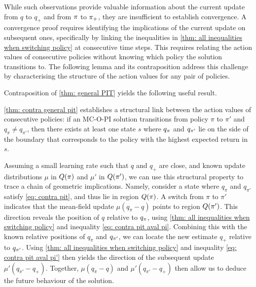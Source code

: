 While such observations provide valuable information about the current update from $q$ to $q_+$ and from $\pi$ to $\pi_+$,
they are insufficient to establish convergence.
A convergence proof requires identifying the implications of the current update on subsequent ones, specifically by linking the inequalities in \autoref{thm: all inequalities when switching policy} at consecutive time steps.
This requires relating the action values of consecutive policies without knowing which policy the solution transitions to.
The following lemma and its contraposition address this challenge by characterising the structure of the action values for any pair of policies.




Contraposition of \autoref{thm: general PIT} yields the following useful result.



\vspace{-0.5cm}

\autoref{thm: contra general pit} establishes a structural link between the action values of consecutive policies:
if an MC-O-PI solution transitions from policy $\pi$ to $\pi'$ and $q_\pi \neq q_{\pi'}$,
then there exists at least one state $s$ where $q_{\pi}$ and $q_{\pi'}$ lie on the side of the boundary that corresponds to the policy with the highest expected return in $s$.

Assuming a small learning rate such that $q$ and $q_+$ are close,
and known update distributions $\mu$ in $Q(\pi)$ and $\mu'$ in $Q(\pi')$,
we can use this structural property to trace a chain of geometric implications.
Namely, consider a state where $q_\pi$ and $q_{\pi'}$ satisfy \eqref{eq: contra pit}, and thus lie in region $Q (\pi)$.
A switch from $\pi$ to $\pi'$ indicates that the mean-field update $\mu(q_\pi - q)$ points to region $Q(\pi')$.
This direction reveals the position of $q$ relative to $q_{\pi}$, using \autoref{thm: all inequalities when switching policy} and inequality \eqref{eq: contra pit aval pi}.
Combining this with the known relative positions of $q_\pi$ and $q_{\pi'}$, we can locate the new estimate $q_+$ relative to $q_{\pi'}$.
Using \autoref{thm: all inequalities when switching policy} and inequality \eqref{eq: contra pit aval pi'} then yields the direction of the subsequent update $\mu'(q_{\pi'} - q_+)$. 
Together, $\mu(q_\pi - q)$ and $\mu'(q_{\pi'} - q_+)$ then allow us to deduce the future behaviour of the solution.

